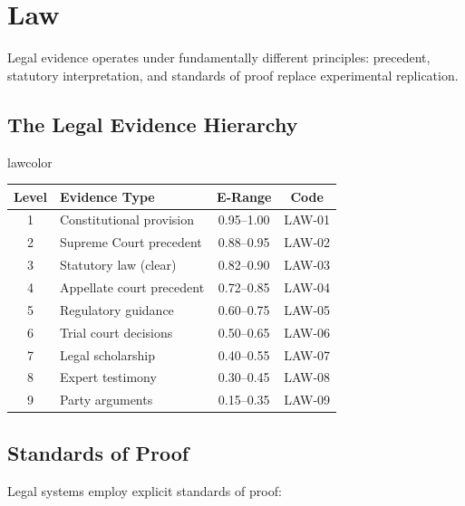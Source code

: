 \documentclass[11pt,a4paper]{article}
\theoremstyle{remark}
\begin{document}

\section{Law}
\label{sec:law}

Legal evidence operates under fundamentally different principles: precedent, statutory interpretation, and standards of proof replace experimental replication.

\subsection{The Legal Evidence Hierarchy}

\begin{disciplinebox}{lawcolor}
\begin{center}
\begin{tabular}{clcc}
\toprule
\textbf{Level} & \textbf{Evidence Type} & \textbf{E-Range} & \textbf{Code} \\
\midrule
1 & Constitutional provision & 0.95--1.00 & LAW-01 \\
2 & Supreme Court precedent & 0.88--0.95 & LAW-02 \\
3 & Statutory law (clear) & 0.82--0.90 & LAW-03 \\
4 & Appellate court precedent & 0.72--0.85 & LAW-04 \\
5 & Regulatory guidance & 0.60--0.75 & LAW-05 \\
6 & Trial court decisions & 0.50--0.65 & LAW-06 \\
7 & Legal scholarship & 0.40--0.55 & LAW-07 \\
8 & Expert testimony & 0.30--0.45 & LAW-08 \\
9 & Party arguments & 0.15--0.35 & LAW-09 \\
\bottomrule
\end{tabular}
\end{center}
\end{disciplinebox}

\subsection{Standards of Proof}

Legal systems employ explicit standards of proof:
\end{document}
